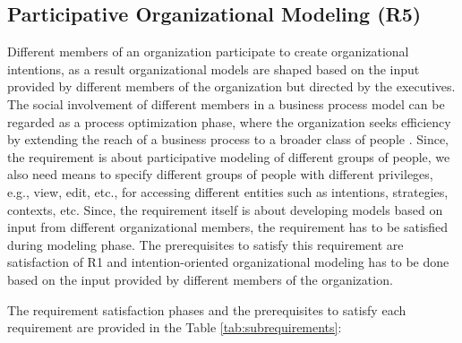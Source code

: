 \subsection{Participative Organizational Modeling (R5)}
Different members of an organization participate to create organizational intentions, as a result organizational models are shaped based on the input provided by different members of the organization but directed by the executives. The social involvement of different members in a business process model can be regarded as a process optimization phase, where the organization seeks efficiency by extending the reach of a business process to a broader class of people \cite{Brambilla2012}. Since, the requirement is about participative modeling of different groups of people, we also need means to specify different groups of people with different privileges, e.g., view, edit, etc., for accessing different entities such as intentions, strategies, contexts, etc. Since, the requirement itself is about developing models based on input from different organizational members, the requirement has to be satisfied during modeling phase. The prerequisites to satisfy this requirement are satisfaction of R1 and intention-oriented organizational modeling has to be done based on the input provided by different members of the organization.  
 
The requirement satisfaction phases and the prerequisites to satisfy each requirement are provided in the Table \ref{tab:subrequirements}:

